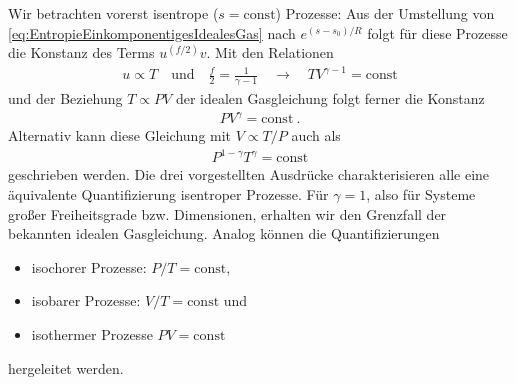 Wir betrachten vorerst isentrope ($s=\mathrm{const}$) Prozesse:
Aus der Umstellung von \eqref{eq:EntropieEinkomponentigesIdealesGas} nach $e^{(s-s_0)/R}$ folgt für diese Prozesse die Konstanz des Terms $u^{(f/2)}v$.  Mit den Relationen
\begin{align*}
    u \propto T \quad\text{und}\quad \frac{f}{2}=\frac{1}{\gamma -1}\quad\rightarrow\quad TV^{\gamma-1}=\mathrm{const}
\end{align*}
und der Beziehung $T\propto PV$ der idealen Gasgleichung folgt ferner die Konstanz
\begin{align*}
    \boxed{PV^{\gamma}=\mathrm{const}}\:.
\end{align*}
Alternativ kann diese Gleichung mit $V\propto T/P$ auch als
\begin{align*}
    P^{1-\gamma}T^\gamma=\mathrm{const}
\end{align*}
geschrieben werden.
Die drei vorgestellten Ausdrücke charakterisieren alle eine äquivalente Quantifizierung isentroper Prozesse.
Für $\gamma = 1$, also für Systeme großer Freiheitsgrade bzw. Dimensionen, erhalten wir den Grenzfall der bekannten idealen Gasgleichung.
Analog können die Quantifizierungen
\begin{itemize}
    \item isochorer Prozesse: ${P}/{T}=\mathrm{const}$,
    \item isobarer Prozesse: ${V}/{T}=\mathrm{const}$ und
    \item isothermer Prozesse $PV=\mathrm{const}$
\end{itemize}
hergeleitet werden.


